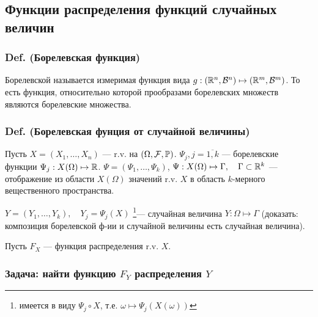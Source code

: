 \subsection{Функции распределения функций случайных
величин}\label{ux444ux443ux43dux43aux446ux438ux438-ux440ux430ux441ux43fux440ux435ux434ux435ux43bux435ux43dux438ux44f-ux444ux443ux43dux43aux446ux438ux439-ux441ux43bux443ux447ux430ux439ux43dux44bux445-ux432ux435ux43bux438ux447ux438ux43d}

\subsubsection{Def. (Борелевская
функция)}\label{def.-ux431ux43eux440ux435ux43bux435ux432ux441ux43aux430ux44f-ux444ux443ux43dux43aux446ux438ux44f}

Борелевской называется измеримая функция вида
\(g : (\mathbb R^n, \mathcal B^n)\mapsto (\mathbb R^m,\mathcal B^m)\). То есть функция,
относительно которой прообразами борелевских множеств являются
борелевские множества.

\subsubsection{Def. (Борелевская фунция от случайной
величины)}\label{def.-ux431ux43eux440ux435ux43bux435ux432ux441ux43aux430ux44f-ux444ux443ux43dux446ux438ux44f-ux43eux442-ux441ux43bux443ux447ux430ux439ux43dux43eux439-ux432ux435ux43bux438ux447ux438ux43dux44b}

Пусть \(X = (X_1, \ldots, X_n)\) --- r.v. на \((\Omega, \mathcal F, \mathbb P)\).
\({\Psi_j, j=\overline{1,k}}\) --- борелевские функции
\({\Psi_j : X(\Omega)\mapsto\mathbb R}\).
\({\Psi = (\Psi_1, \ldots, \Psi_k)}\),
\({\Psi : X(\Omega)\mapsto\Gamma, \quad \Gamma\subset\mathbb R^k}\) ---
отображение из области \(X(\Omega)\) значений r.v. \(X\) в область
\(k\)-мерного вещественного пространства.

\(Y = (Y_1, \ldots, Y_k), \quad Y_j = \Psi_j(X)\)%
\footnote{
  имеется в виду $\Psi_j\circ X$, т.е. $\omega\mapsto\Psi_j(X(\omega))$
}--- случайная величина
\(Y: \Omega\mapsto\Gamma\) (доказать: композиция борелевской ф-ии и
случайной величины есть случайная величина).

Пусть \(F_X\) --- функция распределения r.v. \(X\).

\subsubsection{\texorpdfstring{Задача: найти функцию \(F_Y\)
распределения
\(Y\)}{Задача: найти функцию F\_Y распределения Y}}\label{ux437ux430ux434ux430ux447ux430-ux43dux430ux439ux442ux438-ux444ux443ux43dux43aux446ux438ux44e-fux5fy-ux440ux430ux441ux43fux440ux435ux434ux435ux43bux435ux43dux438ux44f-y}

